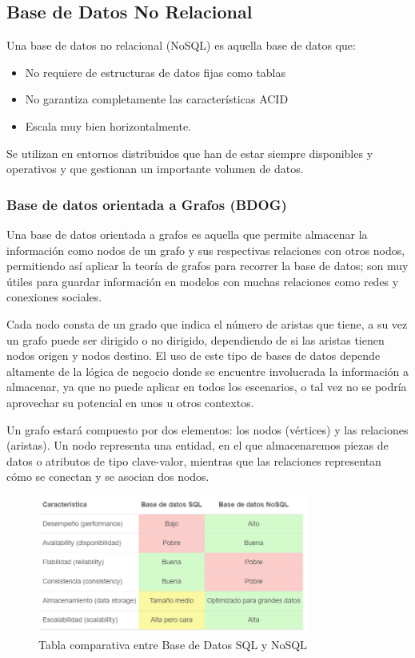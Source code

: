 \documentclass[preprint,12pt]{elsarticle}
\begin{document}

\subsection {\textbf{Base de Datos No Relacional}}

Una base de datos no relacional (NoSQL) es aquella base de datos que:

\begin{itemize}
	\item No requiere de estructuras de datos fijas como tablas
	\item No garantiza completamente las características ACID
	\item Escala muy bien horizontalmente.
\end{itemize}

Se utilizan en entornos distribuidos que han de estar siempre disponibles y operativos y que gestionan un importante volumen de datos.


\subsubsection{\textbf{Base de datos orientada a Grafos (BDOG)}}

Una base de datos orientada a grafos es aquella que permite almacenar la información como nodos de un grafo y sus respectivas relaciones con otros nodos, permitiendo así aplicar la teoría de grafos para recorrer la base de datos; son muy útiles para guardar información en modelos con muchas relaciones como redes y conexiones sociales. 

Cada nodo consta de un grado que indica el número de aristas que tiene, a su vez un grafo puede ser dirigido o no dirigido, dependiendo de si las aristas tienen nodos origen y nodos destino. El uso de este tipo de bases de datos depende altamente de la lógica de negocio donde se encuentre involucrada la información a almacenar, ya que no puede aplicar en todos los escenarios, o tal vez no se podría aprovechar su potencial en unos u otros contextos. 

Un grafo estará compuesto por dos elementos: los nodos (vértices) y las relaciones (aristas). Un nodo representa una entidad, en el que almacenaremos piezas de datos o atributos de tipo clave-valor, mientras que las relaciones representan cómo se conectan y se asocian dos nodos.

\begin{figure}[htb]
	\begin{center}
		\includegraphics[width=9cm]{./IMAGENES/basededatos_3} 
		\caption{Tabla comparativa entre Base de Datos SQL y NoSQL}
	\end{center}
\end{figure}
\end{document}
